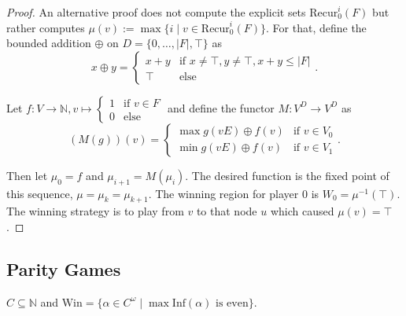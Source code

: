 \documentclass{article}
\begin{document}
\begin{proof}
	An alternative proof does not compute the explicit sets $\text{Recur}^i_0(F)$ but rather computes $\mu(v) := \max \{i \mid v \in \text{Recur}^i_0(F)\}$. For that, define the bounded addition $\oplus$ on $D = \{0, \dots, |F|, \top\}$ as 
	$$x \oplus y = \begin{cases} x+y & \text{if } x \neq \top, y \neq \top, x+y \leq |F| \\ \top & \text{else} \end{cases}.$$
	
	Let $f : V \rightarrow \mathbb{N}, v \mapsto \begin{cases} 1 & \text{if } v \in F \\ 0 & \text{else} \end{cases}$ and define the functor $M : V^D \rightarrow V^D$ as
	$$ (M(g))(v) = \begin{cases}
		\max g(vE) \oplus f(v) & \text{if } v \in V_0 \\
		\min g(vE) \oplus f(v) & \text{if } v \in V_1
	\end{cases}. $$
	
	Then let $\mu_0 = f$ and $\mu_{i+1} = M(\mu_i)$. The desired function is the fixed point of this sequence, $\mu = \mu_k = \mu_{k+1}$. The winning region for player 0 is $W_0 = \mu^{-1}(\top)$. The winning strategy is to play from $v$ to that node $u$ which caused $\mu(v) = \top$.
\end{proof}

\subsection{Parity Games}
$C \subseteq \mathbb{N}$ and $\text{Win} = \{ \alpha \in C^\omega \mid \max \text{Inf}(\alpha) \text{ is even}\}$.
\end{document}

